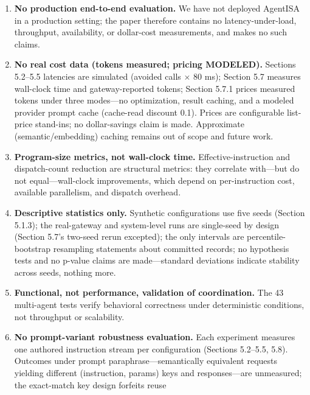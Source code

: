 \documentclass[
  sigconf,
  anonymous]{acmart}
\begin{document}
\begin{enumerate}
  declaration-injection pools (generation n = 15), with scores and
  metrics derived from the same injected declarations---consistency
  checks, not calibration. The \(\pm\) 1.000 entries are step-function
  artifacts of declared-and-enforced gates, and no independent,
  live-model capability measure enters any correlation.
\item
  \textbf{No production end-to-end evaluation.} We have not deployed
  AgentISA in a production setting; the paper therefore contains no
  latency-under-load, throughput, availability, or dollar-cost
  measurements, and makes no such claims.
\item
  \textbf{No real cost data (tokens measured; pricing MODELED).}
  Sections 5.2--5.5 latencies are simulated (avoided calls \(\times\) 80
  ms); Section 5.7 measures wall-clock time and gateway-reported tokens;
  Section 5.7.1 prices measured tokens under three modes---no
  optimization, result caching, and a modeled provider prompt cache
  (cache-read discount 0.1). Prices are configurable list-price
  stand-ins; no dollar-savings claim is made. Approximate
  (semantic/embedding) caching remains out of scope and future work.
\item
  \textbf{Program-size metrics, not wall-clock time.}
  Effective-instruction and dispatch-count reduction are structural
  metrics: they correlate with---but do not equal---wall-clock
  improvements, which depend on per-instruction cost, available
  parallelism, and dispatch overhead.
\item
  \textbf{Descriptive statistics only.} Synthetic configurations use
  five seeds (Section 5.1.3); the real-gateway and system-level runs are
  single-seed by design (Section 5.7's two-seed rerun excepted); the
  only intervals are percentile-bootstrap resampling statements about
  committed records; no hypothesis tests and no p-value claims are
  made---standard deviations indicate stability across seeds, nothing
  more.
\item
  \textbf{Functional, not performance, validation of coordination.} The
  43 multi-agent tests verify behavioral correctness under deterministic
  conditions, not throughput or scalability.
\item
  \textbf{No prompt-variant robustness evaluation.} Each experiment
  measures one authored instruction stream per configuration (Sections
  5.2--5.5, 5.8). Outcomes under prompt paraphrase---semantically
  equivalent requests yielding different (instruction, params) keys and
  responses---are unmeasured; the exact-match key design forfeits reuse

\end{enumerate}
\end{document}
